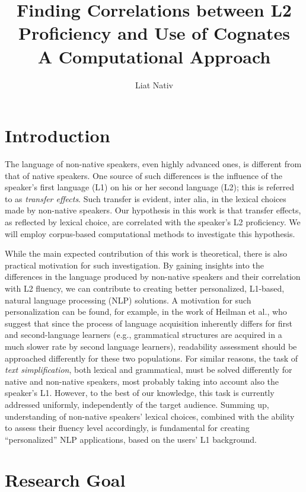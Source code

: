 \documentclass[11pt]{article}
\title{Finding Correlations between L2 Proficiency and Use of Cognates\\[.5em]A Computational Approach}
\author{Liat Nativ}
\date{}
\newcommand{\note}[1]{\textit{\small\color{magenta}{#1}}}
\begin{document}
\maketitle
\thispagestyle{empty}

\section{Introduction}

The language of non-native speakers, even highly advanced ones, is different from that of native speakers. One source of such differences is the influence of the speaker's first language (L1) on his or her second language (L2); this is referred to as \emph{transfer effects}. Such transfer is evident, inter alia, in the lexical choices made by non-native speakers. 
%
Our hypothesis in this work is that transfer effects, as reflected by lexical choice, are correlated with the speaker's L2 proficiency. We will employ corpus-based computational methods to investigate this hypothesis.

While the main expected contribution of this work is theoretical, there is also practical motivation for such investigation. By gaining insights into the differences in the language produced by non-native speakers and their correlation with L2 fluency, we can contribute to creating better personalized, L1-based, natural language processing (NLP) solutions. 
A motivation for such personalization can be found, for example, in the work of Heilman et al., 
\note{fix reference} 
who suggest that since the process of language 
acquisition inherently differs for first and second-language learners (e.g., grammatical structures are acquired in a much slower rate by second language learners), 
readability assessment should be approached differently for these two populations. 
For similar reasons, the task of \emph{text simplification}, both lexical and grammatical, must be solved differently for native and non-native speakers, most probably taking into account also the speaker's L1. However, to the best of our knowledge, this task is currently addressed uniformly, independently of the target audience.
Summing up, understanding of non-native speakers' lexical choices, combined with the ability to assess their fluency level accordingly,
is fundamental for creating ``personalized'' NLP applications, based on the users' L1 background.

\section{Research Goal}
\end{document}
